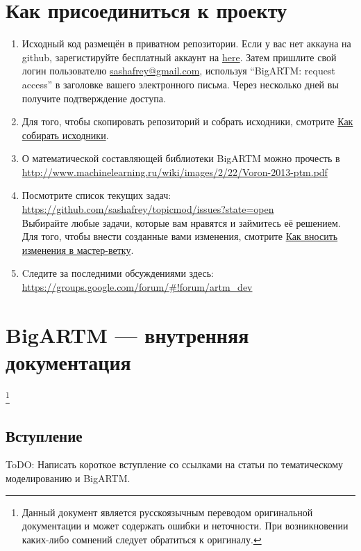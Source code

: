 \documentclass[12pt]{article}
\begin{document}
\tableofcontents
\newpage
\section{Как присоединиться к проекту}
\begin{enumerate}
	\item Исходный код размещён в приватном репозитории. Если у вас нет аккауна на github, зарегистируйте бесплатный аккаунт на \href{https://github.com/}{here}. Затем пришлите свой логин пользователю \href{mailto:sashafrey@gmail.com}{sashafrey@gmail.com}, используя ``BigARTM: request access'' в заголовке вашего электронного письма. Через несколько дней вы получите подтверждение доступа.
	\item Для того, чтобы скопировать репозиторий и собрать исходники, смотрите \hyperref[label:how_to_build]{Как собирать исходники}.
	\item О математической составляющей библиотеки BigARTM можно прочесть в  \\ \url{http://www.machinelearning.ru/wiki/images/2/22/Voron-2013-ptm.pdf}
	\item Посмотрите список текущих задач: \\ 
 	\url{https://github.com/sashafrey/topicmod/issues?state=open}\\
 	Выбирайте любые задачи, которые вам нравятся и займитесь её решением. Для того, чтобы внести созданные вами изменения, смотрите \hyperref[label:how_to_submit]{Как вносить изменения в мастер-ветку}.
 	\item Cледите за последними обсуждениями здесь: \\
 	\url{https://groups.google.com/forum/#!forum/artm_dev}
\end{enumerate}

\section{BigARTM --- внутренняя документация}
\footnote{Данный документ является русскоязычным переводом оригинальной документации и может содержать ошибки и неточности. При возникновении каких-либо сомнений следует обратиться к оригиналу.}
\subsection{Вступление}
ToDO: Написать короткое вступление со ссылками на статьи по тематическому моделированию и BigARTM.
\end{document}

